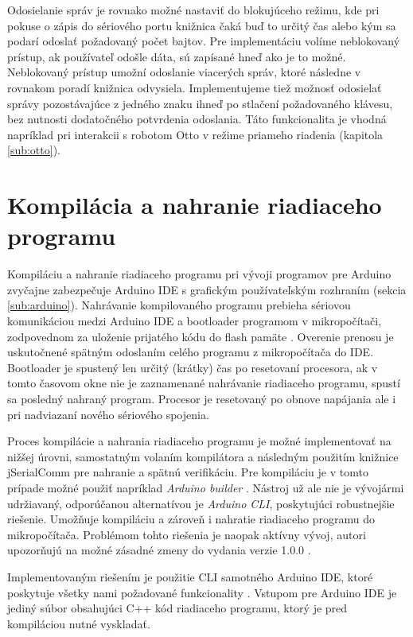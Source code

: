 Odosielanie správ je rovnako možné nastaviť do blokujúceho režimu, kde pri pokuse o zápis do sériového portu knižnica čaká buď to určitý čas alebo kým sa podarí odoslať požadovaný počet bajtov. Pre implementáciu volíme neblokovaný prístup, ak používateľ odošle dáta, sú zapísané hneď ako je to možné. Neblokovaný prístup umožní odoslanie viacerých správ, ktoré následne v rovnakom poradí knižnica odvysiela. Implementujeme tiež možnosť odosielať správy pozostávajúce z jedného znaku ihneď po stlačení požadovaného klávesu, bez nutnosti dodatočného potvrdenia odoslania. Táto funkcionalita je vhodná napríklad pri interakcii s robotom Otto v režime priameho riadenia (kapitola \ref{sub:otto}).


\section{Kompilácia a nahranie riadiaceho programu}
\label{sub:arduinoIDE}
Kompiláciu a nahranie riadiaceho programu pri vývoji programov pre Arduino zvyčajne zabezpečuje Arduino IDE s grafickým používateľským rozhraním (sekcia \ref{sub:arduino}). Nahrávanie kompilovaného programu prebieha sériovou komunikáciou medzi Arduino IDE a bootloader programom v mikropočítači, zodpovednom za uloženie prijatého kódu do flash pamäte \cite{sketchUpload}. Overenie prenosu je uskutočnené spätným odoslaním celého programu z mikropočítača do IDE. Bootloader je spustený len určitý (krátky) čas po resetovaní procesora, ak v tomto časovom okne nie je zaznamenané nahrávanie riadiaceho programu, spustí sa posledný nahraný program. Procesor je resetovaný po obnove napájania ale i pri nadviazaní nového sériového spojenia.

Proces kompilácie a nahrania riadiaceho programu je možné implementovať na nižšej úrovni, samostatným volaním kompilátora a následným použitím knižnice jSerialComm pre nahranie a spätnú verifikáciu. Pre kompiláciu je v tomto prípade možné použiť napríklad \textit{Arduino builder} \cite{arduinoBuilder}. Nástroj už ale nie je vývojármi udržiavaný, odporúčanou alternatívou je \textit{Arduino CLI}, poskytujúci robustnejšie riešenie. Umožňuje kompiláciu a zároveň i nahratie riadiaceho programu do mikropočítača. Problémom tohto riešenia je naopak aktívny vývoj, autori upozorňujú na možné zásadné zmeny do vydania verzie 1.0.0 \cite{arduinoCli}.

Implementovaným riešením je použitie CLI samotného Arduino IDE, ktoré poskytuje všetky nami požadované funkcionality \cite{arduinoIdeCli}. Vstupom pre Arduino IDE je jediný súbor obsahujúci C++ kód riadiaceho programu, ktorý je pred kompiláciou nutné vyskladať.

